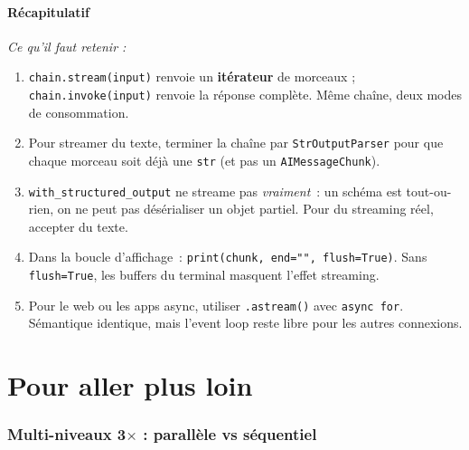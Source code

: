 \documentclass[11pt,a4paper]{article}
\begin{document}
\subsection*{Récapitulatif}
{\itshape\sloppy
\textit{Ce qu'il faut retenir :}
\begin{enumerate}[leftmargin=*]
  \item \texttt{chain.stream(input)} renvoie un \textbf{itérateur} de
        morceaux ; \texttt{chain.invoke(input)} renvoie la réponse
        complète. Même chaîne, deux modes de consommation.
  \item Pour streamer du texte, terminer la chaîne par
        \texttt{StrOutputParser} pour que chaque morceau soit déjà une
        \texttt{str} (et pas un \texttt{AIMessageChunk}).
  \item \texttt{with\_structured\_output} ne streame pas \emph{vraiment}~:
        un schéma est tout-ou-rien, on ne peut pas désérialiser un objet
        partiel. Pour du streaming réel, accepter du texte.
  \item Dans la boucle d'affichage~: \texttt{print(chunk, end="",
        flush=True)}. Sans \texttt{flush=True}, les buffers du terminal
        masquent l'effet streaming.
  \item Pour le web ou les apps async, utiliser \texttt{.astream()} avec
        \texttt{async for}. Sémantique identique, mais l'event loop reste
        libre pour les autres connexions.
\end{enumerate}
\par}

\part{Pour aller plus loin}

\section{Multi-niveaux 3$\times$ : parallèle vs séquentiel}
\end{document}
